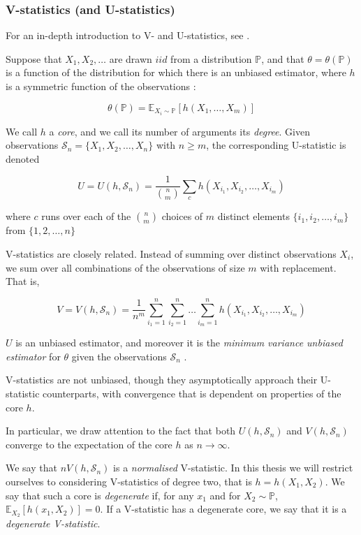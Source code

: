\documentclass[12pt]{article}
\numberwithin{claim}{section}
\numberwithin{lemma}{section}
\numberwithin{theorem}{section}
\begin{document}
\subsubsection{V-statistics (and U-statistics)}

For an in-depth introduction to V- and U-statistics, see \cite{serfling2009approximation}.

Suppose that $X_1,X_2,\ldots$ are drawn $iid$ from a distribution $\mathbb{P}$, and that $\theta =  \theta (\mathbb{P})$ is a function of the distribution for which there is an unbiased estimator, where $h$ is a symmetric function of the observations \cite{serfling2009approximation}:

\[ \theta(\mathbb{P}) = \mathbb{E}_{X_i \sim \mathbb{P}}[h(X_1,\ldots,X_m)]\]

We call $h$ a \emph{core}, and we call its number of arguments its \emph{degree}. Given observations $\mathcal{S}_n = \{X_1,X_2,\ldots,X_n\}$ with $n\geq m$, the corresponding U-statistic is denoted

\[U =  U(h, \mathcal{S}_n) = \frac{1}{\binom{n}{m}}\sum_c h(X_{i_1},X_{i_2},\ldots,X_{i_m}) \]

where $c$ runs over each of the $\binom{n}{m}$ choices of $m$ distinct elements $\{i_1,i_2,\ldots,i_m\}$ from $\{1,2,\ldots,n\}$

V-statistics are closely related. Instead of summing over distinct observations $X_i$, we sum over all combinations of the observations of size $m$ with replacement. That is,

\[V = V(h,\mathcal{S}_n) = \frac{1}{n^m} \sum_{i_1 = 1}^{n} \sum_{i_2 = 1}^{n} \ldots \sum_{i_m = 1}^{n} h(X_{i_1}, X_{i_2},\ldots,X_{i_m})\]


$U$ is an unbiased estimator, and moreover it is the \emph{minimum variance unbiased estimator} for $\theta$ given the observations $\mathcal{S}_n$ \cite{serfling2009approximation}.

V-statistics are not unbiased, though they asymptotically approach their U-statistic counterparts, with convergence that is dependent on properties of the core $h$. 

In particular, we draw attention to the fact that both $U(h,\mathcal{S}_n)$ and $V(h,\mathcal{S}_n)$ converge to the expectation of the core $h$ as $n\longrightarrow \infty$.

We say that $nV(h,\mathcal{S}_n)$ is a \emph{normalised} V-statistic. In this thesis we will restrict ourselves to considering V-statistics of degree two, that is $h = h(X_1,X_2)$. We say that such a core is \emph{degenerate} if, for any $x_1$ and for $X_2 \sim \mathbb{P}$, $\mathbb{E}_{X_2}[h(x_1,X_2)] = 0$. If a V-statistic has a degenerate core, we say that it is a \emph{degenerate V-statistic}.
\end{document}
